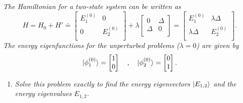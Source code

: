 \begin{example}
	\emph{The Hamiltonian for a two-state system can be written as}
	\begin{equation}
		H=H_0+H'\doteq\begin{bmatrix}
			E_1^{(0)} & 0 \\
			0 & E_2^{(0)}\\
		\end{bmatrix}+\lambda\begin{bmatrix}
			0 &  \Delta \\
			\Delta & 0\\
		\end{bmatrix}=\begin{bmatrix}
			E_1^{(0)} & \lambda \Delta \\
			\lambda \Delta & E_2^{(0)}\\
		\end{bmatrix}.
	\end{equation} 
	\emph{The energy eigenfunctions for the unperturbed problems ($\lambda=0$) are given by}
	\begin{equation}
		\ket{\phi_1^{(0)}}=\begin{bmatrix}
			1 \\
			0 \\
		\end{bmatrix} \quad \mbox{,} \quad \ket{\phi_2^{(0)}}=\begin{bmatrix}
			0 \\
			1 \\
		\end{bmatrix}.
	\end{equation} 
	
	\begin{enumerate}
		\item \emph{Solve this problem exactly to find the energy eigenvectors $\ket{E_{1,2}}$ and the energy eigenvalues $E_{1,2}$.}\newline
		

\end{enumerate}
\end{example}
